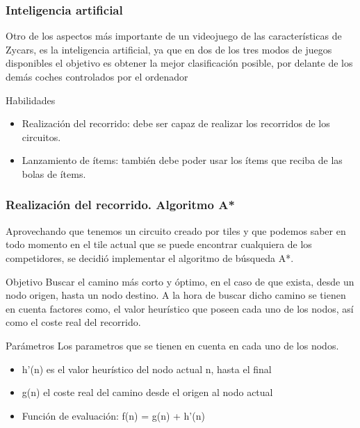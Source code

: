 \begin{frame}
    \frametitle{Inteligencia artificial}
    Otro de los aspectos más importante de un videojuego de las características de Zycars, es la
    inteligencia artificial, ya que en dos de los tres modos de juegos disponibles el objetivo es obtener la
    mejor clasificación posible, por delante de los demás coches controlados por el ordenador

        \begin{block}{Habilidades}
            \begin{itemize}
                \item Realización del recorrido: debe ser capaz de realizar los 
                recorridos de los circuitos.
                \item Lanzamiento de ítems: también debe poder usar los ítems que reciba de las bolas de ítems.
            \end{itemize}
        \end{block}
\end{frame}

\begin{frame}
    \frametitle{Realización del recorrido. Algoritmo A*}

    Aprovechando que tenemos un circuito creado por tiles y que podemos saber en todo momento en el tile 
    actual que se puede encontrar cualquiera de los competidores, se decidió implementar el 
    algoritmo de búsqueda A*.

        \begin{block}{Objetivo}
        Buscar el camino más corto y óptimo, en el caso de que exista, desde
        un nodo origen, hasta un nodo destino. A la hora de buscar dicho camino se tienen en cuenta factores
        como, el valor heurístico que poseen cada uno de los nodos, así como el coste real del recorrido.
        \end{block}

        \begin{block}{Parámetros}
        Los parametros que se tienen en cuenta en cada uno de los nodos.
            \begin{itemize}
                \item h’(n) es el valor heurístico del nodo actual n, hasta el final
                \item g(n) el coste real del camino desde el origen al nodo actual
                \item Función de evaluación: f(n) = g(n) + h’(n)
            \end{itemize}
        \end{block}

\end{frame}

